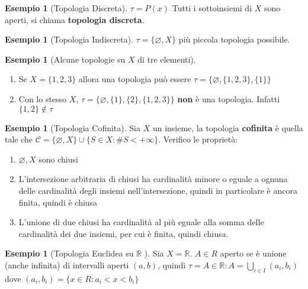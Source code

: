 \documentclass{article}
\newcounter{theo}[section]\setcounter{theo}{0}
\newcounter{excounter}[section]\setcounter{excounter}{0}
\theoremstyle{plain}
\theoremstyle{definition}
\newtheorem{example}[excounter]{Esempio}
\theoremstyle{remark}
\begin{document}
\begin{example}[Topologia Discreta]
    \(\tau = P(x)\) Tutti i sottoinsiemi di \(X\) sono aperti, si chiama
        \textbf{topologia discreta}.
\end{example}
\begin{example}[Topologia Indiscreta]
\(\tau = \{\varnothing, X\} \) più piccola
        topologia possibile.
\end{example}
\begin{example}[Alcune topologie su \(X\) di tre elementi]
\begin{enumerate}[label = \roman*-]
    \item Se \(X = \{1, 2, 3\} \) allora una topologia può essere \(\tau =
        \{\varnothing, \{1, 2, 3\}, \{1\}\} \) 
    \item Con lo stesso \(X\), \(\tau = \{\varnothing, \{1\} , \{2\} , \{1,2,3\}
        \}\) \textbf{non} è una topologia. Infatti \(\{1,2\} \not\in \tau\) 
\end{enumerate}
\end{example}
\begin{example}[Topologia Cofinita]
    \item Sia \(X\) un insieme, la topologia \textbf{cofinita} è quella tale che
        \(\mathcal{C} = \{\varnothing, X\} \cup \{S \in X : \# S < +\infty\}
        \). Verifico le proprietà:
\begin{enumerate}[label = \arabic*)]
    \item \(\varnothing, X\) sono chiusi
    \item L'intersezione arbitraria di chiusi ha cardinalità minore o eguale a
        ognuna delle cardinalità degli insiemi nell'intersezione, quindi in
        particolare è ancora finita, quindi è chiusa
    \item L'unione di due chiusi ha cardinalità al più eguale alla somma delle
        cardinalità dei due insiemi, per cui è finita, quindi chiusa.
\end{enumerate}

\end{example}
\begin{example}[Topologia Euclidea su \(\mathbb{R}\) ]
    Sia \(X = \mathbb{R}\). \(A \in  R\) aperto se è
        unione (anche infinita) di intervalli aperti \((a, b)\), quindi \(\tau =
        A \in  \mathbb{R} : A = \bigcup_{i \in  I} (a_{i}, b_{i})\) dove
        \((a_{i}, b_{i}) = \{x \in R : a_{i} < x < b_{i}\} \) 
\end{example}
\end{document}
